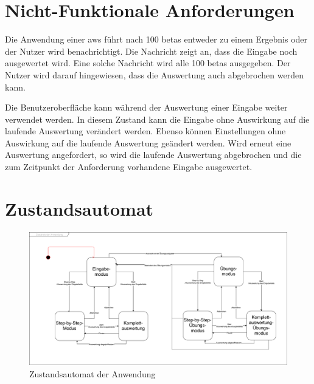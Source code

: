\documentclass[parskip=full,11pt,twoside]{scrartcl}
\begin{document}

\section{Nicht-Funktionale Anforderungen}


Die Anwendung einer \gls{aws} führt nach 100 \glspl{beta} entweder zu einem Ergebnis oder der Nutzer wird benachrichtigt.
Die Nachricht zeigt an, dass die Eingabe noch ausgewertet wird.
Eine solche Nachricht wird alle 100 \glspl{beta} ausgegeben.
Der Nutzer wird darauf hingewiesen, dass die Auswertung auch abgebrochen werden kann.

Die Benutzeroberfläche kann während der Auswertung einer Eingabe weiter verwendet werden.
In diesem Zustand kann die Eingabe ohne Auswirkung auf die laufende Auswertung verändert werden.
Ebenso können Einstellungen ohne Auswirkung auf die laufende Auswertung geändert werden.
Wird erneut eine Auswertung angefordert, so wird die laufende Auswertung abgebrochen und die zum Zeitpunkt der Anforderung vorhandene Eingabe ausgewertet.

\section{Zustandsautomat}

\begin{figure}[H]
	\centering
	\includegraphics[width=\textwidth]{img/Zustandsautomat}
	\caption{\label{fig:state} Zustandsautomat der Anwendung}
\end{figure}
\end{document}
